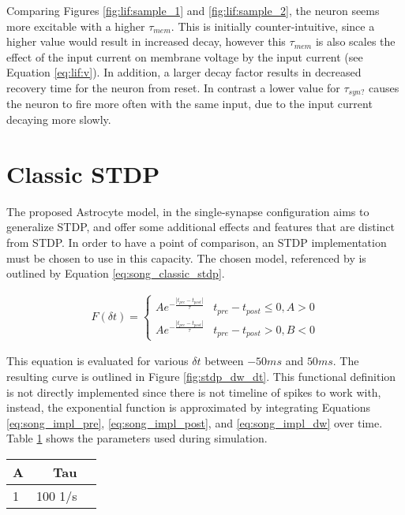 Comparing Figures \ref{fig:lif:sample_1} and \ref{fig:lif:sample_2}, the
neuron seems more excitable with a higher $\tau_{mem}$. This is initially
counter-intuitive, since a higher value would result in increased decay,
however this $\tau_{mem}$ is also scales the effect of the input current on
membrane voltage by the input current (see Equation \ref{eq:lif:v}). In
addition, a larger decay factor results in decreased recovery time for the
neuron from reset. In contrast a lower value for $\tau_{syn?}$ causes the
neuron to fire more often with the same input, due to the input current
decaying more slowly.

\section{Classic STDP} \label{obj1:sec:classic_stdp}
    
The proposed Astrocyte model, in the single-synapse configuration aims to
generalize STDP, and offer some additional effects and features that are
distinct from STDP. In order to have a point of comparison, an STDP
implementation must be chosen to use in this capacity. The chosen model,
referenced by \cite{song_2000} is outlined by Equation
\ref{eq:song_classic_stdp}.

\begin{align}
  F(\delta t) =
  \begin{cases} 
    Ae^{- \frac{|t_{pre}-t_{post}|}{\tau}} & t_{pre} - t_{post} \leq 0, A > 0
    \\ Ae^{- \frac{|t_{pre}-t_{post}|}{\tau}} & t_{pre} - t_{post} > 0, B < 0
  \end{cases} \label{eq:song_classic_stdp}
\end{align}

This equation is evaluated for various $\delta t$ between $-50ms$ and
$50ms$. The resulting curve is outlined in Figure \ref{fig:stdp_dw_dt}. This
functional definition is not directly implemented since there is not timeline of
spikes to work with, instead, the exponential function is approximated by
integrating Equations \ref{eq:song_impl_pre}, \ref{eq:song_impl_post}, and
\ref{eq:song_impl_dw} over time. Table \ref{table:classic_stdp_params} shows the
parameters used during simulation.

\begin{table}[!htp]\centering
  \label{table:classic_stdp_params}
  \scriptsize
  \begin{tabular}{lrr}\toprule
    A &Tau \\\midrule
    1 &100 1/s \\
    \bottomrule
  \end{tabular}
\end{table}

